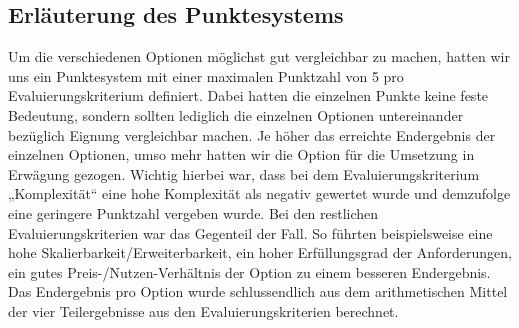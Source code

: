 \subsection*{\textbf{Erläuterung des Punktesystems}}\label{Erläuterung des Punktesystems} 
Um die verschiedenen Optionen möglichst gut vergleichbar zu machen, hatten wir uns ein Punktesystem mit einer maximalen Punktzahl von 5 pro Evaluierungskriterium definiert. Dabei hatten die einzelnen Punkte keine feste Bedeutung, sondern sollten lediglich die einzelnen Optionen untereinander bezüglich Eignung vergleichbar machen. Je höher das erreichte Endergebnis der einzelnen Optionen, umso mehr hatten wir die Option für die Umsetzung in Erwägung gezogen. Wichtig hierbei war, dass bei dem Evaluierungskriterium „Komplexität“ eine hohe Komplexität als negativ gewertet wurde und demzufolge eine geringere Punktzahl vergeben wurde. Bei den restlichen Evaluierungskriterien war das Gegenteil der Fall. So führten beispielsweise eine hohe Skalierbarkeit/Erweiterbarkeit, ein hoher Erfüllungsgrad der Anforderungen, ein gutes Preis-/Nutzen-Verhältnis der Option zu einem besseren Endergebnis. Das Endergebnis pro Option wurde schlussendlich aus dem arithmetischen Mittel der vier Teilergebnisse aus den Evaluierungskriterien berechnet.

